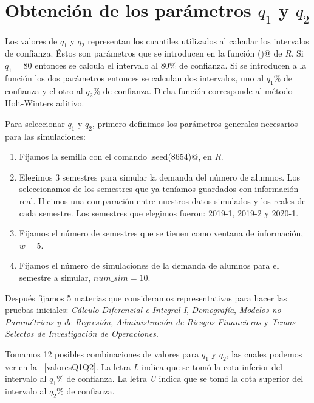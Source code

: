 \section{Obtención de los parámetros $q_{1}$ y $q_{2}$}

Los valores de $q_{1}$ y $q_{2}$ representan los cuantiles utilizados al calcular los intervalos de confianza. Éstos son parámetros que se introducen en la función \verb@hw()@ de \textit{R}. Si $q_{1} = 80$ entonces se calcula el intervalo al $80\%$ de confianza. Si se introducen a la función los dos parámetros entonces se calculan dos intervalos, uno al $q_{1}\%$ de confianza y el otro al $q_{2}\%$ de confianza. Dicha función corresponde al método Holt-Winters aditivo.

Para seleccionar $q_{1}$ y $q_{2}$, primero definimos los parámetros generales necesarios para las simulaciones:
  
  \begin{enumerate}
\item Fijamos la semilla con el comando \verb@set.seed(8654)@, en \textit{R}.

\item Elegimos 3 semestres para simular la demanda del número de alumnos. Los seleccionamos de los semestres que ya teníamos guardados con información real. Hicimos una comparación entre nuestros datos simulados y los reales de cada semestre. Los semestres que elegimos fueron: 2019-1, 2019-2 y 2020-1.

\item Fijamos el número de semestres que se tienen como ventana de información, $w = 5$.

\item Fijamos el número de simulaciones de la demanda de alumnos para el semestre a simular, $num\_sim = 10$.
\end{enumerate}


Después fijamos 5 materias que consideramos representativas para hacer las pruebas iniciales: \textit{Cálculo Diferencial e Integral I}, \textit{Demografía}, \textit{Modelos no Paramétricos y de Regresión}, \textit{Administración de Riesgos Financieros} y \textit{Temas Selectos de Investigación de Operaciones}.

Tomamos 12 posibles combinaciones de valores para $q_{1}$ y $q_{2}$, las cuales podemos ver en la \tablename{~\ref{valoresQ1Q2}}. La letra \textit{L} indica que se tomó la cota inferior del intervalo al $q_{1}\%$ de confianza. La letra \textit{U} indica que se tomó la cota superior del intervalo al $q_{2}\%$ de confianza.

